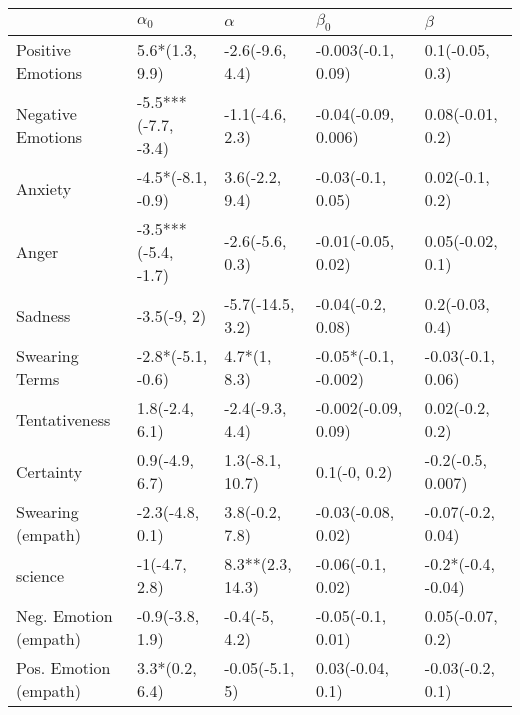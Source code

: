 \begin{tabular}{lllll}
\toprule
{} &           $\alpha_0$ &          $\alpha$ &             $\beta_0$ &             $\beta$ \\
\midrule
Positive Emotions     &       5.6*(1.3, 9.9) &   -2.6(-9.6, 4.4) &    -0.003(-0.1, 0.09) &     0.1(-0.05, 0.3) \\
Negative Emotions     &  -5.5***(-7.7, -3.4) &   -1.1(-4.6, 2.3) &   -0.04(-0.09, 0.006) &    0.08(-0.01, 0.2) \\
Anxiety               &    -4.5*(-8.1, -0.9) &    3.6(-2.2, 9.4) &     -0.03(-0.1, 0.05) &     0.02(-0.1, 0.2) \\
Anger                 &  -3.5***(-5.4, -1.7) &   -2.6(-5.6, 0.3) &    -0.01(-0.05, 0.02) &    0.05(-0.02, 0.1) \\
Sadness               &          -3.5(-9, 2) &  -5.7(-14.5, 3.2) &     -0.04(-0.2, 0.08) &     0.2(-0.03, 0.4) \\
Swearing Terms        &    -2.8*(-5.1, -0.6) &      4.7*(1, 8.3) &  -0.05*(-0.1, -0.002) &   -0.03(-0.1, 0.06) \\
Tentativeness         &       1.8(-2.4, 6.1) &   -2.4(-9.3, 4.4) &   -0.002(-0.09, 0.09) &     0.02(-0.2, 0.2) \\
Certainty             &       0.9(-4.9, 6.7) &   1.3(-8.1, 10.7) &          0.1(-0, 0.2) &   -0.2(-0.5, 0.007) \\
Swearing (empath)     &      -2.3(-4.8, 0.1) &    3.8(-0.2, 7.8) &    -0.03(-0.08, 0.02) &   -0.07(-0.2, 0.04) \\
science               &        -1(-4.7, 2.8) &  8.3**(2.3, 14.3) &     -0.06(-0.1, 0.02) &  -0.2*(-0.4, -0.04) \\
Neg. Emotion (empath) &      -0.9(-3.8, 1.9) &     -0.4(-5, 4.2) &     -0.05(-0.1, 0.01) &    0.05(-0.07, 0.2) \\
Pos. Emotion (empath) &       3.3*(0.2, 6.4) &    -0.05(-5.1, 5) &      0.03(-0.04, 0.1) &    -0.03(-0.2, 0.1) \\
\bottomrule
\end{tabular}
